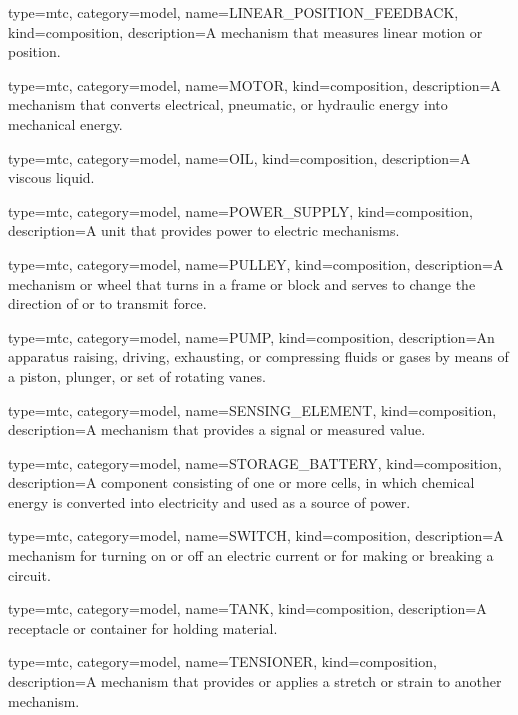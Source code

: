 {
  type=mtc,
  category=model,
  name={LINEAR\_POSITION\_FEEDBACK},
  kind={composition},
  description={A mechanism that measures linear motion or position.}
}


{
  type=mtc,
  category=model,
  name={MOTOR},
  kind={composition},
  description={A mechanism that converts electrical, pneumatic, or hydraulic energy into mechanical energy.}
}


{
  type=mtc,
  category=model,
  name={OIL},
  kind={composition},
  description={A viscous liquid.}
}


{
  type=mtc,
  category=model,
  name={POWER\_SUPPLY},
  kind={composition},
  description={A unit that provides power to electric mechanisms.}
}


{
  type=mtc,
  category=model,
  name={PULLEY},
  kind={composition},
  description={A mechanism or wheel that turns in a frame or block and serves to change the direction of or to transmit force.}
}


{
  type=mtc,
  category=model,
  name={PUMP},
  kind={composition},
  description={An apparatus raising, driving, exhausting, or compressing fluids or gases by means of a piston, plunger, or set of rotating vanes.}
}


{
  type=mtc,
  category=model,
  name={SENSING\_ELEMENT},
  kind={composition},
  description={A mechanism that provides a signal or measured value.}
}


{
  type=mtc,
  category=model,
  name={STORAGE\_BATTERY},
  kind={composition},
  description={A component consisting of one or more cells, in which chemical energy is converted into electricity and used as a source of power. }
}


{
  type=mtc,
  category=model,
  name={SWITCH},
  kind={composition},
  description={A mechanism for turning on or off an electric current or for making or breaking a circuit.}
}


{
  type=mtc,
  category=model,
  name={TANK},
  kind={composition},
  description={A receptacle or container for holding material.}
}


{
  type=mtc,
  category=model,
  name={TENSIONER},
  kind={composition},
  description={A mechanism that provides or applies a stretch or strain to another mechanism.}
}


